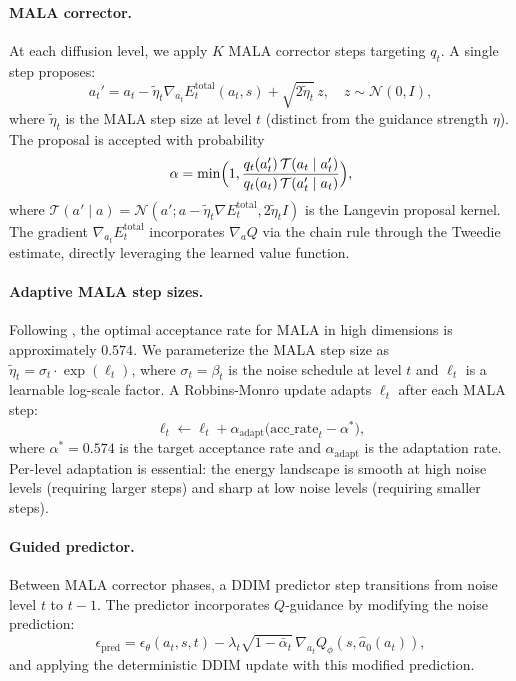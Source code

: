 \documentclass{article}
\theoremstyle{plain}
\theoremstyle{definition}
\theoremstyle{remark}
\begin{document}
\paragraph{MALA corrector.}
At each diffusion level, we apply $K$ MALA corrector steps targeting $q_t$.
A single step proposes:
\begin{equation}
  a_t' = a_t - \tilde{\eta}_t \nabla_{a_t} E_t^{\text{total}}(a_t, s) + \sqrt{2\tilde{\eta}_t}\, z, \quad z \sim \mathcal{N}(0, I),
  \label{eq:mala-proposal}
\end{equation}
where $\tilde{\eta}_t$ is the MALA step size at level $t$ (distinct from the guidance strength $\eta$).
The proposal is accepted with probability
\begin{equation}
  \alpha = \min\Bigl(1, \frac{q_t(a_t') \, \mathcal{T}(a_t \mid a_t')}{q_t(a_t) \, \mathcal{T}(a_t' \mid a_t)}\Bigr),
  \label{eq:mh-accept}
\end{equation}
where $\mathcal{T}(a' \mid a) = \mathcal{N}(a' ; a - \tilde{\eta}_t \nabla E_t^{\text{total}}, 2\tilde{\eta}_t I)$ is the Langevin proposal kernel.
The gradient $\nabla_{a_t} E_t^{\text{total}}$ incorporates $\nabla_a Q$ via the chain rule through the Tweedie estimate, directly leveraging the learned value function.

\paragraph{Adaptive MALA step sizes.}
Following \citet{RobertsTweedie1996MALA}, the optimal acceptance rate for MALA in high dimensions is approximately $0.574$.
We parameterize the MALA step size as $\tilde{\eta}_t = \sigma_t \cdot \exp(\ell_t)$, where $\sigma_t = \beta_t$ is the noise schedule at level $t$ and $\ell_t$ is a learnable log-scale factor.
A Robbins-Monro update adapts $\ell_t$ after each MALA step:
\begin{equation}
  \ell_t \leftarrow \ell_t + \alpha_{\text{adapt}} \bigl(\text{acc\_rate}_t - \alpha^*\bigr),
  \label{eq:eta-adapt}
\end{equation}
where $\alpha^* = 0.574$ is the target acceptance rate and $\alpha_{\text{adapt}}$ is the adaptation rate.
Per-level adaptation is essential: the energy landscape is smooth at high noise levels (requiring larger steps) and sharp at low noise levels (requiring smaller steps).

\paragraph{Guided predictor.}
Between MALA corrector phases, a DDIM predictor step transitions from noise level $t$ to $t{-}1$.
The predictor incorporates $Q$-guidance by modifying the noise prediction:
\begin{equation}
  \epsilon_{\text{pred}} = \epsilon_\theta(a_t, s, t) - \lambda_t \sqrt{1{-}\bar{\alpha}_t} \, \nabla_{a_t} Q_\phi(s, \hat{a}_0(a_t)),
  \label{eq:guided-predictor}
\end{equation}
and applying the deterministic DDIM update with this modified prediction.
\end{document}
